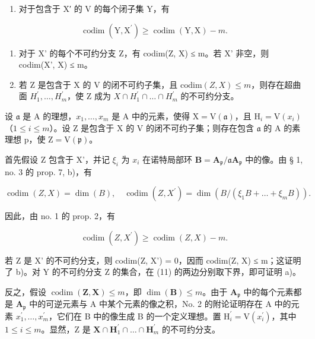 \begin{enumerate}
\def\labelenumi{\alph{enumi})}
\tightlist
\item
  对于包含于 X′ 的 V 的每个闭子集 Y，有
\end{enumerate}

\[
\operatorname{codim} (\mathrm{Y}, \mathrm{X} ^ {\prime}) \geqslant \operatorname{codim} (\mathrm{Y}, \mathrm{X}) - m.
\]

\begin{enumerate}
\def\labelenumi{\alph{enumi})}
\setcounter{enumi}{1}
\item
  对于 X' 的每个不可约分支 Z，有 codim(Z, X) ≤ m。若 X' 非空，则 codim(X', X) ≤ m。
\item
  若 Z 是包含于 X 的 V 的闭不可约子集，且 \(\text{codim}(Z, X) \leqslant m\)，则存在超曲面 \(H_{1}^{\prime}, \ldots, H_{m}^{\prime}\)，使 Z 成为 \(X \cap H_{1}^{\prime} \cap \ldots \cap H_{m}^{\prime}\) 的不可约分支。
\end{enumerate}

设 \(\mathfrak{a}\) 是 A 的理想，\(x_{1},\ldots,x_{m}\) 是 A 中的元素，使得 \(\mathrm{X}=\mathrm{V}(\mathfrak{a})\)，且 \(\mathrm{H}_{i}=\mathrm{V}(x_{i})\)（\(1\leqslant i\leqslant m\)）。设 Z 是包含于 X 的 V 的闭不可约子集；则存在包含 \(\mathfrak{a}\) 的 A 的素理想 p，使 \(\mathrm{Z}=\mathrm{V}(\mathfrak{p})\)。

首先假设 Z 包含于 X'，并记 \(\xi_{i}\) 为 \(x_{i}\) 在诺特局部环 \(\mathbf{B} = \mathbf{A}_{\mathfrak{p}} / \mathfrak{a}\mathbf{A}_{\mathfrak{p}}\) 中的像。由 § 1, no. 3 的 prop. 7, b)，有

\[
\operatorname{codim} (Z, X) = \dim (B), \quad \operatorname{codim} (Z, X ^ {\prime}) = \dim (B / (\xi_ {1} B + \dots + \xi_ {m} B)).
\]

因此，由 no. 1 的 prop. 2，有

\[
\operatorname{codim} (Z, X ^ {\prime}) \geqslant \operatorname{codim} (Z, X) - m.\tag{11}
\]

若 Z 是 X' 的不可约分支，则 codim(Z, X') = 0，因而 codim(Z, X) ≤ m；这证明了 b)。对 Y 的不可约分支 Z 的集合，在 (11) 的两边分别取下界，即可证明 a)。

反之，假设 \(\operatorname{codim}(\mathbf{Z},\mathbf{X})\leqslant m\)，即 \(\dim (\mathbf{B})\leqslant m\)。由于 \(\mathbf{A}_{\mathfrak{p}}\) 中的每个元素都是 \(\mathbf{A}_{\mathfrak{p}}\) 中的可逆元素与 A 中某个元素的像之积，No. 2 的附论证明存在 A 中的元素 \(x_1^{\prime},\ldots ,x_m^\prime\)，它们在 B 中的像生成 B 的一个定义理想。置 \(\mathrm{H}_i^{\prime} = \mathrm{V}(x_i^{\prime})\)，其中 \(1\leqslant i\leqslant m\)。显然，Z 是 \(\mathbf{X}\cap \mathbf{H}_1^{\prime}\cap \dots \cap \mathbf{H}_m^{\prime}\) 的不可约分支。

